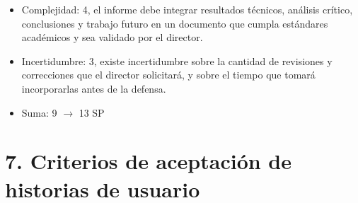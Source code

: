 \documentclass[
11pt, %
]{charter}
\begin{document}
\begin{itemize}
\begin{itemize}
\begin{itemize}
        \item Complejidad: 4, el informe debe integrar resultados técnicos, análisis crítico, conclusiones y trabajo futuro en un documento que cumpla 
        estándares académicos y sea validado por el director.
        \item Incertidumbre: 3, existe incertidumbre sobre la cantidad de revisiones y correcciones que el director solicitará, y sobre el tiempo que 
        tomará incorporarlas antes de la defensa. 
        \item Suma: 9 $\rightarrow$ 13 SP
      \end{itemize}
    \end{itemize}
\end{itemize}

\section{7. Criterios de aceptación de historias de usuario}
\label{sec:criteriosAceptacion}
\end{document}

